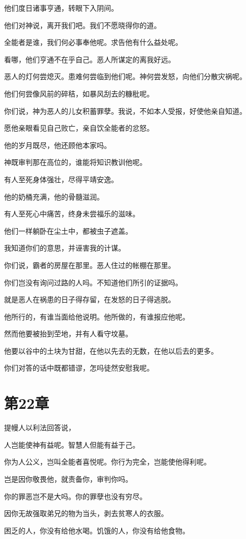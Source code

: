 \documentclass[12pt,oneside]{book}
\begin{document}
他们度日诸事亨通，转眼下入阴间。

他们对神说，离开我们吧。我们不愿晓得你的道。

全能者是谁，我们何必事奉他呢。求告他有什么益处呢。

看哪，他们亨通不在乎自己。恶人所谋定的离我好远。

恶人的灯何尝熄灭。患难何尝临到他们呢。神何尝发怒，向他们分散灾祸呢。

他们何尝像风前的碎秸，如暴风刮去的糠秕呢。

你们说，神为恶人的儿女积蓄罪孽。我说，不如本人受报，好使他亲自知道。

愿他亲眼看见自己败亡，亲自饮全能者的忿怒。

他的岁月既尽，他还顾他本家吗。

神既审判那在高位的，谁能将知识教训他呢。

有人至死身体强壮，尽得平靖安逸。

他的奶桶充满，他的骨髓滋润。

有人至死心中痛苦，终身未尝福乐的滋味。

他们一样躺卧在尘土中，都被虫子遮盖。

我知道你们的意思，并诬害我的计谋。

你们说，霸者的房屋在那里。恶人住过的帐棚在那里。

你们岂没有询问过路的人吗。不知道他们所引的证据吗。

就是恶人在祸患的日子得存留，在发怒的日子得逃脱。

他所行的，有谁当面给他说明。他所做的，有谁报应他呢。

然而他要被抬到茔地，并有人看守坟墓。

他要以谷中的土块为甘甜，在他以先去的无数，在他以后去的更多。

你们对答的话中既都错谬，怎吗徒然安慰我呢。


\chapter{第22章}
提幔人以利法回答说，

人岂能使神有益呢。智慧人但能有益于己。

你为人公义，岂叫全能者喜悦呢。你行为完全，岂能使他得利呢。

岂是因你敬畏他，就责备你，审判你吗。

你的罪恶岂不是大吗。你的罪孽也没有穷尽。

因你无故强取弟兄的物为当头，剥去贫寒人的衣服。

困乏的人，你没有给他水喝。饥饿的人，你没有给他食物。
\end{document}
